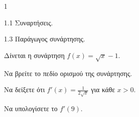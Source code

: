 \begin{ylh}{1}
    \item 1.1 Συναρτήσεις.
    \item 1.3 Παράγωγος συνάρτησης.
\end{ylh}


Δίνεται η συνάρτηση $f(x) = \sqrt{x} - 1$.
\begin{alist}
    \item Να βρείτε το πεδίο ορισμού της συνάρτησης. 
    \item Να δείξετε ότι $f'(x) = \frac{1}{2\sqrt{x}}$ για κάθε $x > 0$. 
    \item Να υπολογίσετε το $f'(9)$. 
\end{alist}

